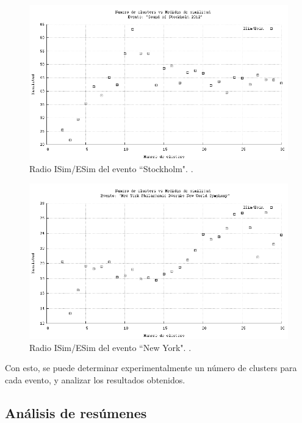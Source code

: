 \begin{figure}[h]
  \centering
  \includegraphics[width=14cm]{./img/stockholm-clusters-radio.png}
  \caption[Radios de similitud para evento 3]
   { Radio ISim/ESim del evento ``Stockholm". \label{fig:stockholm-radio}. }
\end{figure}

\begin{figure}[h]
  \centering
  \includegraphics[width=14cm]{./img/dvorak-clusters-radio.png}
  \caption[Radios de similitud para evento 4]
   { Radio ISim/ESim del evento ``New York". \label{fig:dvorak-radio}. }
\end{figure}

Con esto, se puede determinar experimentalmente un número de clusters
para cada evento, y analizar los resultados obtenidos.

\subsection{Análisis de resúmenes}
\label{sec-4.4.3}


